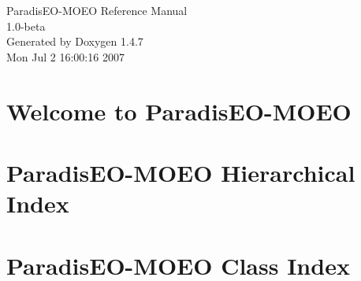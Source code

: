 \documentclass[a4paper]{book}
\begin{document}
\begin{titlepage}
\vspace*{7cm}
\begin{center}
{\Large Paradis\-EO-MOEO Reference Manual\\[1ex]\large 1.0-beta }\\
\vspace*{1cm}
{\large Generated by Doxygen 1.4.7}\\
\vspace*{0.5cm}
{\small Mon Jul 2 16:00:16 2007}\\
\end{center}
\end{titlepage}
\clearemptydoublepage
{}
\tableofcontents
\clearemptydoublepage
{}
\chapter{Welcome to Paradis\-EO-MOEO }
\label{index}
\chapter{Paradis\-EO-MOEO Hierarchical Index}

\chapter{Paradis\-EO-MOEO Class Index}

\end{document}
